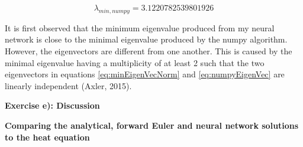 \documentclass[12pt,a4paper]{article}
\begin{document}
\begin{equation}\label{eq:numpyEigenVal}
\lambda_{min,numpy} = 3.1220782539801926
\end{equation}

\noindent It is first observed that the minimum eigenvalue produced from my neural network is close to the minimal eigenvalue produced by the numpy algorithm. However, the eigenvectors are different from one another. This is caused by the minimal eigenvalue having a multiplicity of at least 2 such that the two eigenvectors in equations \ref{eq:minEigenVecNorm} and \ref{eq:numpyEigenVec} are linearly independent (Axler, 2015). 

\newpage

\begin{center}
\Large{\textbf{Exercise e): Discussion}}
\end{center}

\begin{center}
\large{\textbf{Comparing the analytical, forward Euler and neural network solutions to the heat equation}}
\end{center}
\end{document}
